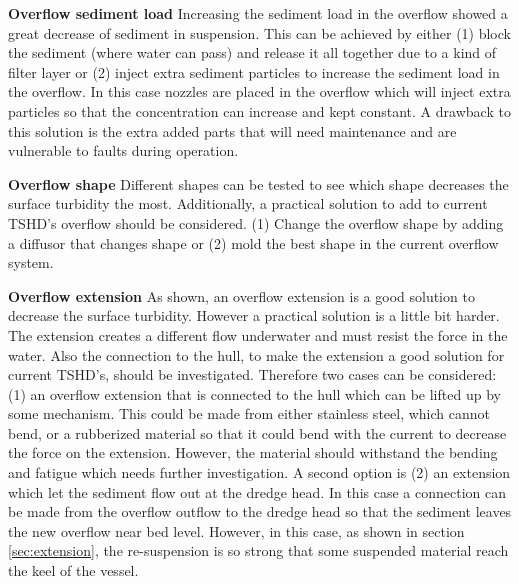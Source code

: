\noindent \textbf{Overflow sediment load} \newline
\noindent Increasing the sediment load in the overflow showed a great decrease of sediment in suspension. This can be achieved by either (1) block the sediment (where water can pass) and release it all together due to a kind of filter layer or (2) inject extra sediment particles to increase the sediment load in the overflow. In this case nozzles are placed in the overflow which will inject extra particles so that the concentration can increase and kept constant. A drawback to this solution is the extra added parts that will need maintenance and are vulnerable to faults during operation.\newline

\noindent \textbf{Overflow shape} \newline
\noindent Different shapes can be tested to see which shape decreases the surface turbidity the most. Additionally, a practical solution to add to current TSHD's overflow should be considered. \newline (1) Change the overflow shape by adding a diffusor that changes shape or (2) mold the best shape in the current overflow system. \newline

\noindent \textbf{Overflow extension} \newline
\noindent As shown, an overflow extension is a good solution to decrease the surface turbidity. However a practical solution is a little bit harder. The extension creates a different flow underwater and must resist the force in the water. Also the connection to the hull, to make the extension a good solution for current TSHD's, should be investigated. \newline Therefore two cases can be considered: (1) an overflow extension that is connected to the hull which can be lifted up by some mechanism. This could be made from either stainless steel, which cannot bend, or a rubberized material so that it could bend with the current to decrease the force on the extension. However, the material should withstand the bending and fatigue which needs further investigation. A second option is (2) an extension which let the sediment flow out at the dredge head. In this case a connection can be made from the overflow outflow to the dredge head so that the sediment leaves the new overflow near bed level. However, in this case, as shown in section \ref{sec:extension}, the re-suspension is so strong that some suspended material reach the keel of the vessel.






